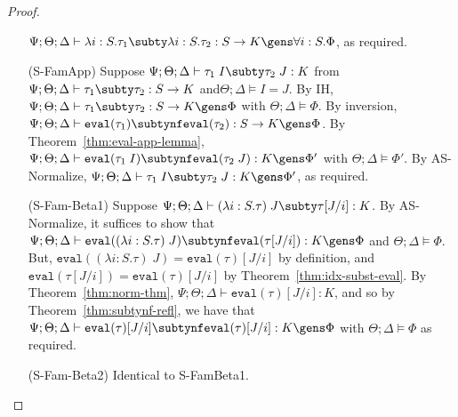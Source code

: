 \begin{proof}
\begin{itemize}
   $\Psi ; \Theta ; \Delta \vdash \lambda i : S. \tau_1 \subty \lambda i : S. \tau_2 : S \to K \gens \forall i : S. \Phi$, as required.
   \item[(S-FamApp)] Suppose $\Psi ; \Theta ; \Delta \vdash \tau_1 \; I \subty \tau_2 \; J : K$ from $\Psi ; \Theta ; \Delta \vdash \tau_1 \subty \tau_2 : S \to K$ and$\Theta ; \Delta \vDash I = J$. By IH,  $\Psi ; \Theta ; \Delta \vdash \tau_1 \subty \tau_2 : S \to K \gens \Phi$ with $\Theta ; \Delta \vDash \Phi$. By inversion, $\Psi ; \Theta ; \Delta \vdash \texttt{eval}(\tau_1) \subtynf \texttt{eval}(\tau_2) : S \to K \gens \Phi$. By Theorem~\ref{thm:eval-app-lemma},
   $\Psi ; \Theta ; \Delta \vdash \texttt{eval}(\tau_1 \; I) \subtynf \texttt{eval}(\tau_2 \; J) : K \gens \Phi'$ with $\Theta ; \Delta \vDash \Phi'$.
   By AS-Normalize, $\Psi ; \Theta ; \Delta \vdash \tau_1 \; I \subty \tau_2 \; J : K \gens \Phi'$, as required.
   
   \item[(S-Fam-Beta1)] Suppose $\Psi ; \Theta ; \Delta \vdash (\lambda i : S. \tau) \; J \subty \tau[J/i] : K$. By AS-Normalize, it suffices to show that
   $\Psi ; \Theta ; \Delta \vdash \texttt{eval}((\lambda i : S. \tau) \; J) \subtynf \texttt{eval}(\tau[J/i]) : K \gens \Phi$ and $\Theta ; \Delta \vDash \Phi$.
   But, $\texttt{eval}((\lambda i : S. \tau) \; J) = \texttt{eval}(\tau)[J/i]$ by definition, and $\texttt{eval}(\tau[J/i]) = \texttt{eval}(\tau)[J/i]$ by Theorem~\ref{thm:idx-subst-eval}. By Theorem~\ref{thm:norm-thm},  $\Psi ; \Theta ; \Delta \vdash \texttt{eval}(\tau)[J/i] : K$, and so by Theorem~\ref{thm:subtynf-refl}, we have that $\Psi ; \Theta ; \Delta \vdash \texttt{eval}(\tau)[J/i] \subtynf \texttt{eval}(\tau)[J/i] : K \gens \Phi$ with $\Theta ; \Delta \vDash \Phi$ as required.
   \item[(S-Fam-Beta2)] Identical to S-FamBeta1.
 \end{itemize}
\end{proof}